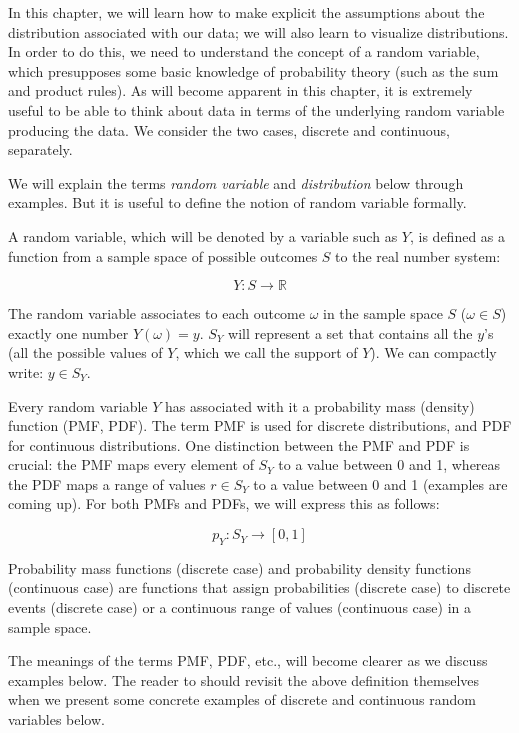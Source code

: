 \documentclass[12pt,]{krantz}
\begin{document}
In this chapter, we will learn how to make explicit the assumptions about the distribution associated with our data; we will also learn to visualize distributions. In order to do this, we need to understand the concept of a random variable, which presupposes some basic knowledge of probability theory (such as the sum and product rules). As will become apparent in this chapter, it is extremely useful to be able to think about data in terms of the underlying random variable producing the data. We consider the two cases, discrete and continuous, separately.

We will explain the terms \emph{random variable} and \emph{distribution} below through examples. But it is useful to define the notion of random variable formally.

A random variable, which will be denoted by a variable such as \(Y\), is defined as a function from a sample space of possible outcomes \(S\) to the real number system:

\begin{equation}
Y : S \rightarrow \mathbb{R}
\end{equation}

The random variable associates to each outcome \(\omega\) in the sample space \(S\) (\(\omega \in S\)) exactly one number \(Y(\omega) = y\). \(S_Y\) will represent a set that contains all the \(y\)'s (all the possible values of \(Y\), which we call the support of \(Y\)). We can compactly write: \(y \in S_Y\).

Every random variable \(Y\) has associated with it a probability mass (density) function (PMF, PDF). The term PMF is used for discrete distributions, and PDF for continuous distributions. One distinction between the PMF and PDF is crucial: the PMF maps every element of \(S_Y\) to a value between 0 and 1, whereas the PDF maps a range of values \(r\in S_Y\) to a value between 0 and 1 (examples are coming up). For both PMFs and PDFs, we will express this as follows:

\begin{equation}
p_Y : S_Y \rightarrow [0, 1] 
\end{equation}

Probability mass functions (discrete case) and probability density functions (continuous case) are functions that assign probabilities (discrete case) to discrete events (discrete case) or a continuous range of values (continuous case) in a sample space.

The meanings of the terms PMF, PDF, etc., will become clearer as we discuss examples below. The reader to should revisit the above definition themselves when we present some concrete examples of discrete and continuous random variables below.
\end{document}
